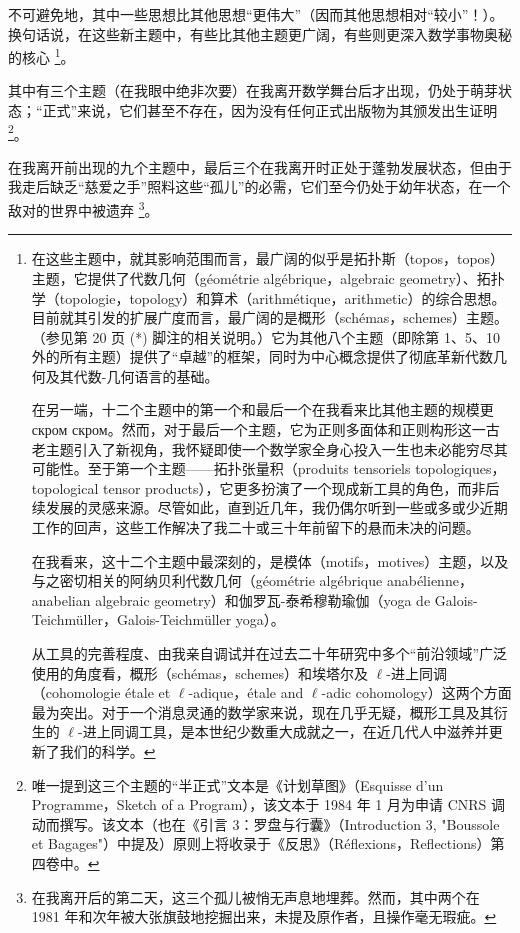 不可避免地，其中一些思想比其他思想“更伟大”（因而其他思想相对“较小”！）。换句话说，在这些新主题中，有些比其他主题更广阔，有些则更深入数学事物奥秘的核心 \footnote{在这些主题中，就其影响范围而言，最广阔的似乎是拓扑斯（topos，topos）主题，它提供了代数几何（géométrie algébrique，algebraic geometry）、拓扑学（topologie，topology）和算术（arithmétique，arithmetic）的综合思想。目前就其引发的扩展广度而言，最广阔的是概形（schémas，schemes）主题。（参见第 20 页 (*) 脚注的相关说明。）它为其他八个主题（即除第 1、5、10 外的所有主题）提供了“卓越”的框架，同时为中心概念提供了彻底革新代数几何及其代数-几何语言的基础。

在另一端，十二个主题中的第一个和最后一个在我看来比其他主题的规模更 скром скром。然而，对于最后一个主题，它为正则多面体和正则构形这一古老主题引入了新视角，我怀疑即使一个数学家全身心投入一生也未必能穷尽其可能性。至于第一个主题——拓扑张量积（produits tensoriels topologiques，topological tensor products），它更多扮演了一个现成新工具的角色，而非后续发展的灵感来源。尽管如此，直到近几年，我仍偶尔听到一些或多或少近期工作的回声，这些工作解决了我二十或三十年前留下的悬而未决的问题。

在我看来，这十二个主题中最深刻的，是模体（motifs，motives）主题，以及与之密切相关的阿纳贝利代数几何（géométrie algébrique anabélienne，anabelian algebraic geometry）和伽罗瓦-泰希穆勒瑜伽（yoga de Galois-Teichmüller，Galois-Teichmüller yoga）。

从工具的完善程度、由我亲自调试并在过去二十年研究中多个“前沿领域”广泛使用的角度看，概形（schémas，schemes）和埃塔尔及 $\ell$-进上同调（cohomologie étale et $\ell$-adique，étale and $\ell$-adic cohomology）这两个方面最为突出。对于一个消息灵通的数学家来说，现在几乎无疑，概形工具及其衍生的 $\ell$-进上同调工具，是本世纪少数重大成就之一，在近几代人中滋养并更新了我们的科学。}。  

其中有三个主题（在我眼中绝非次要）在我离开数学舞台后才出现，仍处于萌芽状态；“正式”来说，它们甚至不存在，因为没有任何正式出版物为其颁发出生证明 \footnote{唯一提到这三个主题的“半正式”文本是《计划草图》（Esquisse d’un Programme，Sketch of a Program），该文本于 1984 年 1 月为申请 CNRS 调动而撰写。该文本（也在《引言 3：罗盘与行囊》（Introduction 3, "Boussole et Bagages"）中提及）原则上将收录于《反思》（Réflexions，Reflections）第四卷中。}。  

在我离开前出现的九个主题中，最后三个在我离开时正处于蓬勃发展状态，但由于我走后缺乏“慈爱之手”照料这些“孤儿”的必需，它们至今仍处于幼年状态，在一个敌对的世界中被遗弃 \footnote{在我离开后的第二天，这三个孤儿被悄无声息地埋葬。然而，其中两个在 1981 年和次年被大张旗鼓地挖掘出来，未提及原作者，且操作毫无瑕疵。}。  

